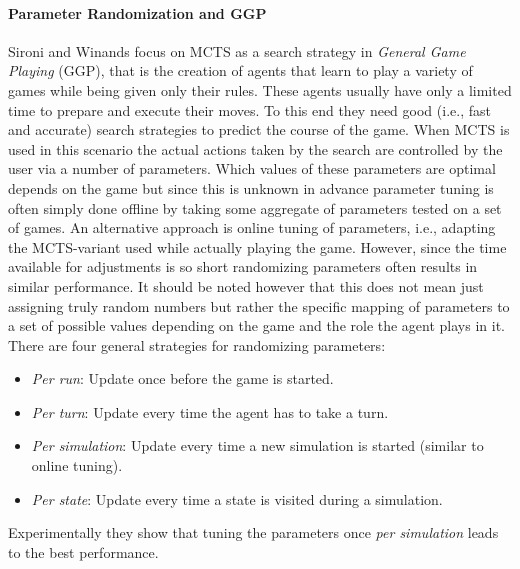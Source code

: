 \paragraph{Parameter Randomization and GGP}
Sironi and Winands \cite{sironi2019comparing} focus on MCTS as a search strategy in \textit{General Game Playing} (GGP), that is the creation of agents that learn to play a variety of games while being given only their rules. These agents usually have only a limited time to prepare and execute their moves. To this end they need good (i.e., fast and accurate) search strategies to predict the course of the game. When MCTS is used in this scenario the actual actions taken by the search are controlled by the user via a number of parameters. Which values of these parameters are optimal depends on the game but since this is unknown in advance parameter tuning is often simply done offline by taking some aggregate of parameters tested on a set of games. An alternative approach is online tuning of parameters, i.e., adapting the MCTS-variant used while actually playing the game. However, since the time available for adjustments is so short randomizing parameters often results in similar performance. It should be noted however that this does not mean just assigning truly random numbers but rather the specific mapping of parameters to a set of possible values depending on the game and the role the agent plays in it. There are four general strategies for randomizing parameters:
\begin{itemize}
    \item \textit{Per run}: Update once before the game is started.
    \item \textit{Per turn}: Update every time the agent has to take a turn.
    \item \textit{Per simulation}: Update every time a new simulation is started (similar to online tuning).
    \item \textit{Per state}: Update every time a state is visited during a simulation.
\end{itemize}
Experimentally they show that tuning the parameters once \textit{per simulation} leads to the best performance.


